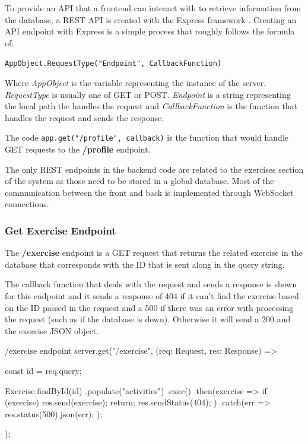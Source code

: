 To provide an API that a frontend can interact with to retrieve information from the database, a REST API is created with the Express framework \cite{express}. Creating an API endpoint with Express is a simple process that roughly follows the formula of:

\texttt{AppObject.RequestType("Endpoint", CallbackFunction)}

Where \textit{AppObject} is the variable representing the instance of the server. \textit{RequestType} is usually one of GET or POST. \textit{Endpoint} is a string representing the local path the handles the request and \textit{CallbackFunction} is the function that handles the request and sends the response.

The code \texttt{app.get("/profile", callback)} is the function that would handle GET requests to the \textbf{/profile} endpoint. 

The only REST endpoints in the backend code are related to the exercises section of the system as those need to be stored in a global database. Most of the communication between the front and back is implemented through WebSocket connections.

\subsubsection{Get Exercise Endpoint}

The \textbf{/exercise} endpoint is a GET request that returns the related exercise in the database that corresponds with the ID that is sent along in the query string.

The callback function that deals with the request and sends a response is shown for this endpoint and it sends a response of 404 if it can't find the exercise based on the ID passed in the request and a 500 if there was an error with processing the request (such as if the database is down). Otherwise it will send a 200 and the exercise JSON object.

\begin{sexylisting}{/exercise endpoint}
server.get("/exercise", (req: Request, res: Response) => {
    const { id } = req.query;

    Exercise.findById(id)
        .populate("activities")
        .exec()
        .then(exercise => {
            if (exercise) {
                res.send(exercise);
                return;
            }
            res.sendStatus(404);
        })
        .catch(err => {
            res.status(500).json(err);
        });
});
\end{sexylisting}

